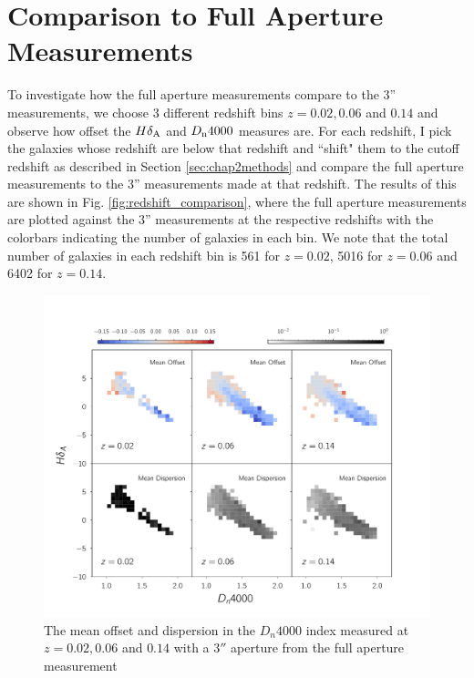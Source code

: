 \section{Comparison to Full Aperture Measurements}
To investigate how the full aperture measurements compare to the 3'' measurements, we choose 3 different redshift bins $z = 0.02,0.06$ and $0.14$ and observe how offset the $H\delta_{\rm A}$ and $D_{\rm n}4000$ measures are. For each redshift, I pick the galaxies whose redshift are below that redshift and ``shift" them to the cutoff redshift as described in Section \ref{sec:chap2methods} and compare the full aperture measurements to the 3'' measurements made at that redshift. The results of this are shown in Fig. \ref{fig:redshift_comparison}, where the full aperture measurements are plotted against the 3'' measurements at the respective redshifts with the colorbars indicating the number of galaxies in each bin. We note that the total number of galaxies in each redshift bin is 561 for $z = 0.02$, 5016 for $z = 0.06$ and 6402 for $z = 0.14$.\\

\begin{figure}
\includegraphics[width=\textwidth]{figures/dn4000_full_aperture_comparisons.pdf}
\caption[Short figure name.]{ The mean offset and dispersion in the $D_{n}4000$ index measured at $z = 0.02,0.06$ and $0.14$ with a $3''$ aperture from the full aperture measurement
\label{fig:myInlineFigure}}
\end{figure}

